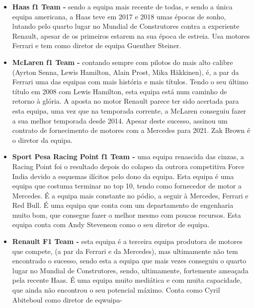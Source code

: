 \documentclass{report}
\begin{document}
\begin{itemize}
    \item \textbf{Haas \ac{f1} Team -} sendo a equipa mais recente de todas, e sendo a única equipa americana, a Haas teve em 2017 e 2018 umas épocas de sonho, lutando pelo quarto lugar no Mundial de Construtores contra a experiente Renault, apesar de os primeiros estarem na sua época de estreia. Usa motores Ferrari e tem como diretor de equipa Guenther Steiner.
    \item \textbf{McLaren \ac{f1} Team -} contando sempre com pilotos do mais alto calibre (Ayrton Senna, Lewis Hamilton, Alain Prost, Mika Häkkinen), é, a par da Ferrari uma das equipas com mais história e mais títulos. Tendo o seu último título em 2008 com  Lewis Hamilton, esta equipa está num caminho de retorno à glória. A aposta no motor Renault parece ter sido acertada para esta equipa, uma vez que na temporada corrente, a McLaren conseguiu fazer a sua melhor temporada desde 2014. Apesar deste sucesso, assinou um contrato de fornecimento de motores com a Mercedes para 2021. Zak Brown é o diretor da equipa.
    \item \textbf{Sport Pesa Racing Point \ac{f1} Team -} uma equipa renascida das cinzas, a Racing Point foi o resultado depois do colapso da outrora competitiva Force India devido a esquemas ilícitos pelo dono da equipa. Esta equipa é uma equipa que costuma terminar no top 10, tendo como fornecedor de motor a Mercedes. É a equipa mais constante no pódio, a seguir à Mercedes, Ferrari e Red Bull. É uma equipa que conta com um departamento de engenharia muito bom, que consegue fazer o melhor mesmo com poucos recursos. Esta equipa conta com Andy Stevenson como o seu diretor de equipa.
    \item \textbf{Renault F1 Team -} esta equipa é a terceira equipa produtora de motores que compete, (a par da Ferrari e da Mercedes), mas ultimamente não tem encontrado o sucesso, sendo esta a equipa que mais vezes conseguiu o quarto lugar no Mundial de Construtores, sendo, ultimamente, fortemente ameaçada pela recente Haas. É uma equipa muito mediática e com muita capacidade, que ainda não encontrou o seu potencial máximo. Conta como Cyril Abiteboul como diretor de eqwuipa-
\end{itemize}
\end{document}
